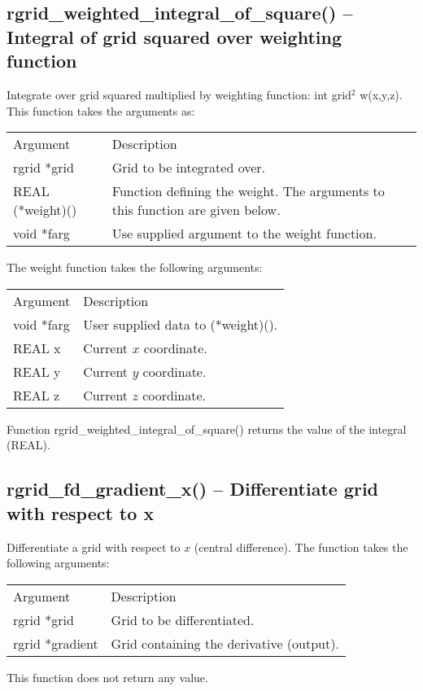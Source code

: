 \documentclass[12pt,letterpaper]{report}
\begin{document}
\subsection{rgrid\_weighted\_integral\_of\_square() -- Integral of grid squared over weighting function}

Integrate over grid squared multiplied by weighting function: int grid$^2$ w(x,y,z). This function takes the arguments as:
\begin{longtable}{p{} p{}}
Argument & Description\\
\cline{1-2}
rgrid *grid & Grid to be integrated over.\\
REAL (*weight)() & Function defining the weight. The arguments to this function are given below.\\
void *farg & Use supplied argument to the weight function.\\
\end{longtable}
\noindent
The weight function takes the following arguments:
\begin{longtable}{p{} p{}}
Argument & Description\\
\cline{1-2}
void *farg & User supplied data to (*weight)().\\
REAL x & Current $x$ coordinate.\\
REAL y & Current $y$ coordinate.\\
REAL z & Current $z$ coordinate.\\
\end{longtable}
\noindent
Function rgrid\_weighted\_integral\_of\_square() returns the value of the integral (REAL).

\subsection{rgrid\_fd\_gradient\_x() -- Differentiate grid with respect to x}

Differentiate a grid with respect to $x$ (central difference). The function takes the following arguments:
\begin{longtable}{p{} p{}}
Argument & Description\\
\cline{1-2}
rgrid *grid & Grid to be differentiated.\\
rgrid *gradient & Grid containing the derivative (output).\\
\end{longtable}
\noindent
This function does not return any value.
\end{document}
